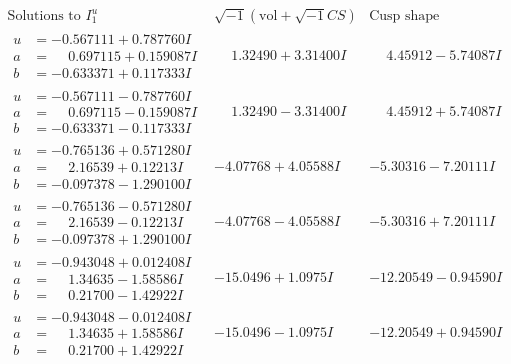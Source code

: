 \documentclass[1p]{elsarticle_modified}
\theoremstyle{definition}
\newcommand{\I}{\sqrt{-1}}
\begin{document}
$$\begin{array}{c|c|c}  
\text{Solutions to }I^u_{1}& \I (\text{vol} + \sqrt{-1}CS) & \text{Cusp shape}\\
 \hline 
\begin{aligned}
u &= -0.567111 + 0.787760 I \\
a &= \phantom{-}0.697115 + 0.159087 I \\
b &= -0.633371 + 0.117333 I\end{aligned}
 & \phantom{-}1.32490 + 3.31400 I & \phantom{-}4.45912 - 5.74087 I \\ \hline\begin{aligned}
u &= -0.567111 - 0.787760 I \\
a &= \phantom{-}0.697115 - 0.159087 I \\
b &= -0.633371 - 0.117333 I\end{aligned}
 & \phantom{-}1.32490 - 3.31400 I & \phantom{-}4.45912 + 5.74087 I \\ \hline\begin{aligned}
u &= -0.765136 + 0.571280 I \\
a &= \phantom{-}2.16539 + 0.12213 I \\
b &= -0.097378 - 1.290100 I\end{aligned}
 & -4.07768 + 4.05588 I & -5.30316 - 7.20111 I \\ \hline\begin{aligned}
u &= -0.765136 - 0.571280 I \\
a &= \phantom{-}2.16539 - 0.12213 I \\
b &= -0.097378 + 1.290100 I\end{aligned}
 & -4.07768 - 4.05588 I & -5.30316 + 7.20111 I \\ \hline\begin{aligned}
u &= -0.943048 + 0.012408 I \\
a &= \phantom{-}1.34635 - 1.58586 I \\
b &= \phantom{-}0.21700 - 1.42922 I\end{aligned}
 & -15.0496 + 1.0975 I & -12.20549 - 0.94590 I \\ \hline\begin{aligned}
u &= -0.943048 - 0.012408 I \\
a &= \phantom{-}1.34635 + 1.58586 I \\
b &= \phantom{-}0.21700 + 1.42922 I\end{aligned}
 & -15.0496 - 1.0975 I & -12.20549 + 0.94590 I \\ \hline\begin{aligned}

\end{aligned}
\end{array}$$
\end{document}
